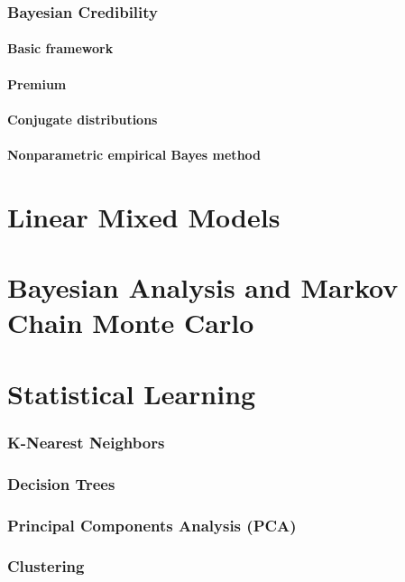 \documentclass[english]{article}
\begin{document}
\begin{multicols*}{2}
\newpage
\section{Bayesian Credibility}\label{sec:Bayes}
\subsection{Basic framework}


\subsection{Premium}



\subsection{Conjugate distributions}

\subsection{Nonparametric empirical Bayes method}




\newpage
\part{Linear Mixed Models}\label{part:LMM}




\newpage
\part{Bayesian Analysis and Markov Chain Monte Carlo}\label{part:BAandMCMC}




\newpage
\part{Statistical Learning}\label{part:statLearn}
\section{K-Nearest Neighbors}\label{sec:KNN}


\newpage
\section{Decision Trees}


\newpage
\section{Principal Components Analysis (PCA)}\label{sec:PCA}


\newpage
\section{Clustering}





\end{multicols*}
\end{document}
